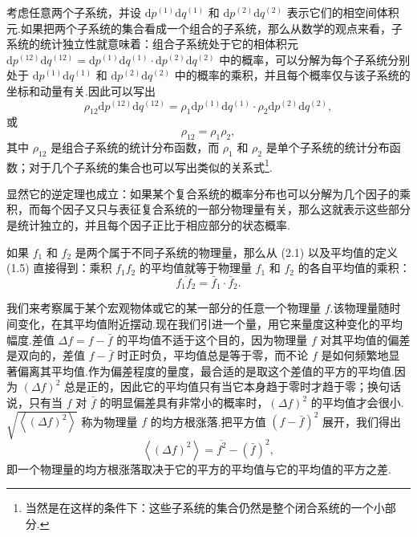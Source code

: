 考虑任意两个子系统，并设 $\mathrm{d}p^{(1)}\mathrm{d}q^{(1)}$ 和 $\mathrm{d}p^{(2)}\mathrm{d}q^{(2)}$ 表示它们的相空间体积元.如果把两个子系统的集合看成一个组合的子系统，那么从数学的观点来看，子系统的统计独立性就意味着：组合子系统处于它的相体积元 $\mathrm{d}p^{(12)}\mathrm{d}q^{(12)}=\mathrm{d}p^{(1)}\mathrm{d}q^{(1)}\cdot\mathrm{d}p^{(2)}\mathrm{d}q^{(2)}$ 中的概率，可以分解为每个子系统分别处于 $\mathrm{d}p^{(1)}\mathrm{d}q^{(1)}$ 和 $\mathrm{d}p^{(2)}\mathrm{d}q^{(2)}$ 中的概率的乘积，并且每个概率仅与该子系统的坐标和动量有关.因此可以写出
\begin{equation*}
  \rho_{12}\mathrm{d}p^{(12)}\mathrm{d}q^{(12)}
  =\rho_1\mathrm{d}p^{(1)}\mathrm{d}q^{(1)}\cdot\rho_2\mathrm{d}p^{(2)}\mathrm{d}q^{(2)},
\end{equation*}
或
\begin{equation}
  \rho_{12}=\rho_1\rho_2,
\end{equation}
其中 $\rho_{12}$ 是组合子系统的统计分布函数，而 $\rho_1$ 和 $\rho_2$ 是单个子系统的统计分布函数；对于几个子系统的集合也可以写出类似的关系式\footnote{当然是在这样的条件下：这些子系统的集合仍然是整个闭合系统的一个小部分.}.

显然它的逆定理也成立：如果某个复合系统的概率分布也可以分解为几个因子的乘积，而每个因子又只与表征复合系统的一部分物理量有关，那么这就表示这些部分是统计独立的，并且每个因子正比于相应部分的状态概率.

如果 $f_1$ 和 $f_2$ 是两个属于不同子系统的物理量，那么从 (2.1) 以及平均值的定义 (1.5) 直接得到：乘积 $f_1f_2$ 的平均值就等于物理量 $f_1$ 和 $f_2$ 的各自平均值的乘积：
\begin{equation}
  \overline{f_1f_2}=\bar{f}_1\cdot\bar{f}_2.
\end{equation}

我们来考察属于某个宏观物体或它的某一部分的任意一个物理量 $f$.该物理量随时间变化，在其平均值附近摆动.现在我们引进一个量，用它来量度这种变化的平均幅度.差值 $\Delta f=f-\bar{f}$ 的平均值不适于这个目的，因为物理量 $f$ 对其平均值的偏差是双向的，差值 $f-\bar{f}$ 时正时负，平均值总是等于零，而不论 $f$ 是如何频繁地显著偏离其平均值.作为偏差程度的量度，最合适的是取这个差值的平方的平均值.因为 $(\Delta f)^2$ 总是正的，因此它的平均值只有当它本身趋于零时才趋于零；换句话说，只有当 $f$ 对 $\bar{f}$ 的明显偏差具有非常小的概率时，$(\Delta f)^2$ 的平均值才会很小.$\sqrt{\left\langle(\Delta f)^2\right\rangle}$ 称为物理量 $f$ 的均方根涨落.把平方值 $(f-\bar{f})^2$ 展开，我们得出
\begin{equation}
  \left\langle(\Delta f)^2\right\rangle=\overline{f^2}-(\bar{f})^2,
\end{equation}
即一个物理量的均方根涨落取决于它的平方的平均值与它的平均值的平方之差.

